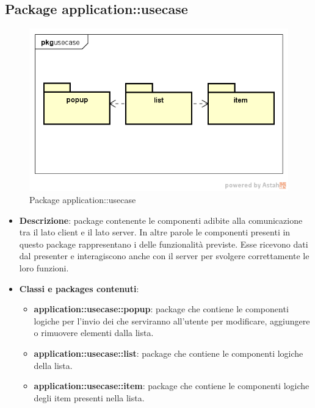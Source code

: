 \subsection{Package application::usecase}
\label{Package application::usecase}
\begin{figure}[H]
	\centering
	\includegraphics[scale=0.6]{Sezioni/Packages/App/pck_usecase.png}
	\caption{Package application::usecase}
\end{figure}
\begin{itemize}
\item \textbf{Descrizione}: package contenente le componenti adibite alla comunicazione tra il lato client e il lato server. In altre parole le componenti presenti in questo package rappresentano i  delle funzionalità previste. Esse ricevono dati dal presenter e interagiscono anche con il server per svolgere correttamente le loro funzioni.
\item \textbf{Classi e packages contenuti}:
\begin{itemize}
\item \textbf{application::usecase::popup}: package che contiene le componenti logiche per l'invio dei  che serviranno all'utente per modificare, aggiungere o rimuovere elementi dalla lista.
\item \textbf{application::usecase::list}: package che contiene le componenti logiche della lista.
\item \textbf{application::usecase::item}: package che contiene le componenti logiche degli item presenti nella lista.
\end{itemize}
\end{itemize}

